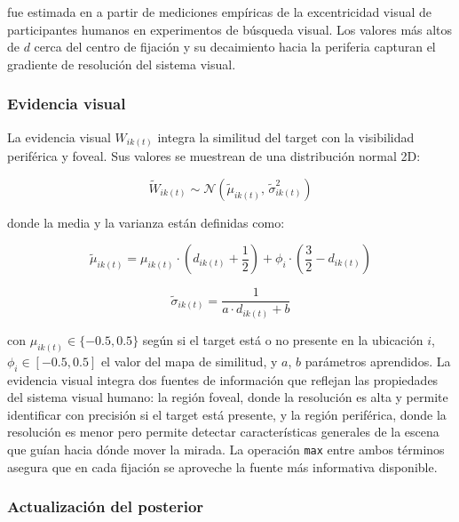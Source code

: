 \noindent fue estimada en \citet{bujia2022} a partir de
mediciones empíricas de la excentricidad visual de participantes
humanos en experimentos de búsqueda visual. 
Los valores más altos de $d$ cerca del centro de fijación y su 
decaimiento hacia la periferia capturan el gradiente de resolución 
del sistema visual.

\subsubsection{Evidencia visual}

La evidencia visual $W_{ik(t)}$ integra la similitud del target con 
la visibilidad periférica y foveal. Sus valores se muestrean de una 
distribución normal 2D:

\begin{equation}
    \widetilde{W}_{ik(t)} \sim \mathcal{N}\left(\widetilde{\mu}_{ik(t)},\, 
    \widetilde{\sigma}^2_{ik(t)}\right)
\end{equation}

\noindent donde la media y la varianza están definidas como:

\begin{equation}
    \widetilde{\mu}_{ik(t)} = \mu_{ik(t)} \cdot \left(d_{ik(t)} + 
    \frac{1}{2}\right) + \phi_i \cdot \left(\frac{3}{2} - d_{ik(t)}\right)
\end{equation}

\begin{equation}
    \widetilde{\sigma}_{ik(t)} = \frac{1}{a \cdot d_{ik(t)} + b}
\end{equation}

\noindent con $\mu_{ik(t)} \in \{-0.5, 0.5\}$ según si el target 
está o no presente en la ubicación $i$, $\phi_i \in [-0.5, 0.5]$ 
el valor del mapa de similitud, y $a$, $b$ parámetros aprendidos. 
La evidencia visual integra dos fuentes de información que reflejan 
las propiedades del sistema visual humano: la región foveal, donde 
la resolución es alta y permite identificar con precisión si el 
target está presente, y la región periférica, donde la resolución 
es menor pero permite detectar características generales de la escena 
que guían hacia dónde mover la mirada. La operación \texttt{max} entre 
ambos términos asegura que en cada fijación se aproveche la fuente 
más informativa disponible.

\subsubsection{Actualización del posterior}

